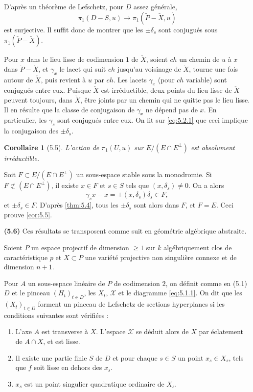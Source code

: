 \documentclass[12pt,a4paper]{amsart}
\theoremstyle{plain}
\newtheorem{corollaire}[theoreme]{Corollaire}
\theoremstyle{definition}
\theoremstyle{remark}
\numberwithin{equation}{section}
\begin{document}
D'apr\`es un th\'eor\`eme de Lefschetz, pour $D$ assez g\'en\'erale,
\[
\pi_1(D-S,u) \longrightarrow \pi_1(\check{P}-\check{X},u)
\]
est surjective. Il suffit donc de montrer que les $\pm\delta_s$ sont conjugu\'es sous $\pi_1(\check{P}-\check{X})$.

Pour $x$ dans le lieu lisse de codimension $1$ de $\check{X}$, soient $ch$ un chemin de $u$ \`a $x$ dans $\check{P}-\check{X}$, et $\gamma_x$ le lacet qui suit $ch$ jusqu'au voisinage de $\check{X}$, tourne une fois autour de $\check{X}$, puis revient \`a $u$ par $ch$. Les lacets $\gamma_x$ (pour $ch$ variable) sont conjugu\'es entre eux. Puisque $\check{X}$ est irr\'eductible, deux points du lieu lisse de $\check{X}$ peuvent toujours, dans $\check{X}$, \^etre joints par un chemin qui ne quitte pas le lieu lisse. Il en r\'esulte que la classe de conjugaison de $\gamma_x$ ne d\'epend pas de $x$. En particulier, les $\gamma_s$ sont conjugu\'es entre eux. On lit sur \eqref{eq:5.2.1} que ceci implique la conjugaison des $\pm\delta_s$.

\begin{corollaire}[5.5]\label{cor:5.5}
L'action de $\pi_1(U,u)$ sur $E/(E\cap E^\perp)$ est absolument irr\'eductible.
\end{corollaire}

Soit $F\subset E/(E\cap E^\perp)$ un sous-espace stable sous la monodromie. Si $F\not\subset (E\cap E^\perp)$, il existe $x\in F$ et $s\in S$ tels que $(x,\delta_s)\not=0$. On a alors
\[
\gamma_s x - x = \pm (x,\delta_s)\delta_s \in F,
\]
et $\pm\delta_s\in F$. D'apr\`es \eqref{thm:5.4}, tous les $\pm\delta_s$ sont alors dans $F$, et $F=E$. Ceci prouve \eqref{cor:5.5}.

\noindent \textbf{(5.6)} Ces r\'esultats se transposent comme suit en g\'eom\'etrie alg\'ebrique abstraite.

Soient $P$ un espace projectif de dimension $\ge 1$ sur $k$ alg\'ebriquement clos de caract\'eristique $p$ et $X\subset P$ une vari\'et\'e projective non singuli\`ere connexe et de dimension $n+1$.

Pour $A$ un sous-espace lin\'eaire de $P$ de codimension $2$, on d\'efinit comme en (5.1) $D$ et le pinceau $(H_t)_{t\in D}$, les $X_t$, $\mathcal{X}$ et le diagramme \eqref{eq:5.1.1}. On dit que les $(X_t)_{t\in D}$ forment un pinceau de Lefschetz de sections hyperplanes si les conditions suivantes sont v\'erifi\'ees :
\begin{enumerate}
\item[A)] L'axe $A$ est transverse \`a $X$. L'espace $\mathcal{X}$ se d\'eduit alors de $X$ par \'eclatement de $A\cap X$, et est lisse.
\item[B)] Il existe une partie finie $S$ de $D$ et pour chaque $s\in S$ un point $x_s\in X_s$, tels que $f$ soit lisse en dehors des $x_s$.
\item[C)] $x_s$ est un point singulier quadratique ordinaire de $X_s$.
\end{enumerate}
\end{document}
